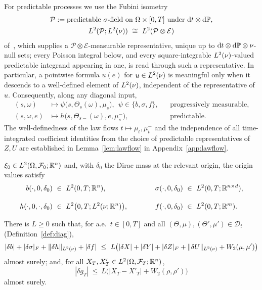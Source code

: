 For predictable processes we use the Fubini isometry
\begin{gather}
\mathcal P:=\text{predictable $\sigma$-field on }\Omega\times[0,T]\text{ under }\mathrm{d} t\otimes\mathrm{d}\mathbb{P},\notag\\
L^2(\mathcal P;L^2(\nu))\ \cong\ L^2(\mathcal P\otimes\mathcal E)\label{eq:fubiniiso}
\end{gather}
of~\cite[Propositions~1.2.24 and~1.2.25]{HNVW}, which supplies a
$\mathcal P\otimes\mathcal E$-measurable representative, unique up to
$\mathrm{d} t\otimes\mathrm{d}\mathbb{P}\otimes\nu$-null sets; every Poisson integral below, and every
square-integrable $L^2(\nu)$-valued predictable integrand appearing in one, is read through
such a representative. In particular, a pointwise formula $u(e)$ for $u\in L^2(\nu)$ is
meaningful only when it descends to a well-defined element of $L^2(\nu)$, independent of
the representative of $u$. Consequently, along any diagonal input,
\begin{equation}\label{eq:coefmeas}
\begin{aligned}
(s,\omega)&\mapsto\psi\big(s,\Theta_s(\omega),\mu_s\big),\ \ \psi\in\{b,\sigma,f\},
&&\text{progressively measurable},\\[2pt]
(s,\omega,e)&\mapsto h\big(s,\Theta_{s-}(\omega),e,\mu_s^-\big),
&&\text{predictable}.
\end{aligned}
\end{equation}
The well-definedness of the law flows $t\mapsto\mu_t,\mu_t^-$ and the independence of all
time-integrated coefficient identities from the choice of predictable representatives of
$Z,U$ are established in Lemma~\ref{lem:lawflow} in Appendix~\ref{app:lawflow}.

\begin{assumption}\label{ass:integ}
$\xi_0\in L^2(\Omega,\mathcal{F}_0;\mathbb{R}^n)$ and, with $\delta_0$ the Dirac mass at the relevant origin,
the origin values satisfy
\[
\begin{aligned}
b(\cdot,0,\delta_0)\ &\in\ L^2(0,T;\mathbb{R}^n),
&\qquad\quad \sigma(\cdot,0,\delta_0)\ &\in\ L^2(0,T;\mathbb{R}^{n\times d}),\\[2.2ex]
h(\cdot,0,\cdot,\delta_0)\ &\in\ L^2\bigl(0,T;L^2(\nu;\mathbb{R}^n)\bigr),
&\qquad\quad f(\cdot,0,\delta_0)\ &\in\ L^2(0,T;\mathbb{R}^m).
\end{aligned}
\]
\end{assumption}
\begin{assumption}\label{ass:lip}
There is $L\ge0$ such that, for a.e.\ $t\in[0,T]$ and all
$(\Theta,\mu),(\Theta',\mu')\in\mathcal D_t$ (Definition~\ref{def:diag}),
\[
|\delta b|+|\delta\sigma|_F+\lVert \delta h\rVert_{L^2(\nu)}+|\delta f|
\ \le\ L\bigl(|\delta X|+|\delta Y|+|\delta Z|_F+\lVert \delta U\rVert_{L^2(\nu)}+W_2(\mu,\mu')\bigr)
\]
almost surely; and, for all $X_T,X'_T\in L^2(\Omega,\mathcal{F}_T;\mathbb{R}^n)$,
\begin{equation}\label{eq:lipT}
|\delta g_T|\ \le\ L\bigl(|X_T-X'_T|+W_2(\rho,\rho')\bigr)
\end{equation}
almost surely.
\end{assumption}

